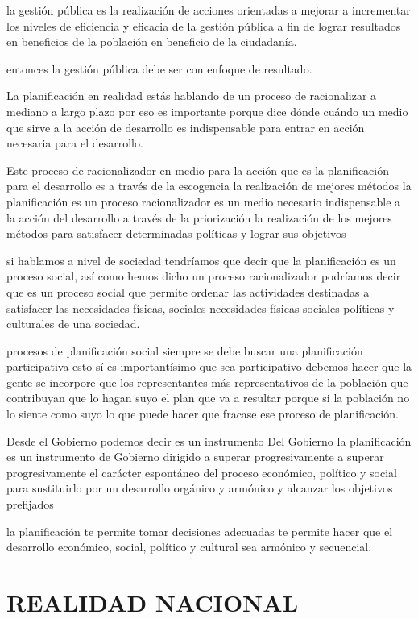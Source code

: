 \documentclass[
  a4paper,
]{article}
\begin{document}
la gestión pública es la realización de acciones orientadas a mejorar a
incrementar los niveles de eficiencia y eficacia de la gestión pública a
fin de lograr resultados en beneficios de la población en beneficio de
la ciudadanía.

entonces la gestión pública debe ser con enfoque de resultado.

La planificación en realidad estás hablando de un proceso de
racionalizar a mediano a largo plazo por eso es importante porque dice
dónde cuándo un medio que sirve a la acción de desarrollo es
indispensable para entrar en acción necesaria para el desarrollo.

Este proceso de racionalizador en medio para la acción que es la
planificación para el desarrollo es a través de la escogencia la
realización de mejores métodos la planificación es un proceso
racionalizador es un medio necesario indispensable a la acción del
desarrollo a través de la priorización la realización de los mejores
métodos para satisfacer determinadas políticas y lograr sus objetivos

si hablamos a nivel de sociedad tendríamos que decir que la
planificación es un proceso social, así como hemos dicho un proceso
racionalizador podríamos decir que es un proceso social que permite
ordenar las actividades destinadas a satisfacer las necesidades físicas,
sociales necesidades físicas sociales políticas y culturales de una
sociedad.

procesos de planificación social siempre se debe buscar una
planificación participativa esto sí es importantísimo que sea
participativo debemos hacer que la gente se incorpore que los
representantes más representativos de la población que contribuyan que
lo hagan suyo el plan que va a resultar porque si la población no lo
siente como suyo lo que puede hacer que fracase ese proceso de
planificación.

Desde el Gobierno podemos decir es un instrumento Del Gobierno la
planificación es un instrumento de Gobierno dirigido a superar
progresivamente a superar progresivamente el carácter espontáneo del
proceso económico, político y social para sustituirlo por un desarrollo
orgánico y armónico y alcanzar los objetivos prefijados

la planificación te permite tomar decisiones adecuadas te permite hacer
que el desarrollo económico, social, político y cultural sea armónico y
secuencial.

\hypertarget{realidad-nacional}{%
\section{REALIDAD NACIONAL}\label{realidad-nacional}}
\end{document}
